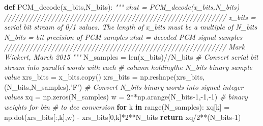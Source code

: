 \documentclass[11pt]{article}
\newenvironment{Shaded}{}{}
\newcommand{\KeywordTok}[1]{\textcolor[rgb]{0.00,0.44,0.13}{\textbf{{#1}}}}
\newcommand{\DecValTok}[1]{\textcolor[rgb]{0.25,0.63,0.44}{{#1}}}
\newcommand{\StringTok}[1]{\textcolor[rgb]{0.25,0.44,0.63}{{#1}}}
\newcommand{\CommentTok}[1]{\textcolor[rgb]{0.38,0.63,0.69}{\textit{{#1}}}}
\newcommand{\NormalTok}[1]{{#1}}
\newcommand{\ControlFlowTok}[1]{\textcolor[rgb]{0.00,0.44,0.13}{\textbf{{#1}}}}
\newcommand{\OperatorTok}[1]{\textcolor[rgb]{0.40,0.40,0.40}{{#1}}}
\newcommand{\BuiltInTok}[1]{{#1}}
\begin{document}
\begin{Shaded}
\begin{Highlighting}[]
    
\KeywordTok{def}\NormalTok{ PCM_decode(x_bits,N_bits):}
    \CommentTok{"""}
\CommentTok{    xhat = PCM_decode(x_bits,N_bits)}
\CommentTok{    /////////////////////////////////////////////////////////////}
\CommentTok{    x_bits = serial bit stream of 0/1 values. The length of }
\CommentTok{             x_bits must be a multiple of N_bits}
\CommentTok{    N_bits = bit precision of PCM samples}
\CommentTok{      xhat = decoded PCM signal samples}
\CommentTok{    /////////////////////////////////////////////////////////////}
\CommentTok{    Mark Wickert, March 2015}
\CommentTok{    """}
\NormalTok{    N_samples }\OperatorTok{=} \BuiltInTok{len}\NormalTok{(x_bits)}\OperatorTok{//}\NormalTok{N_bits}
    \CommentTok{# Convert serial bit stream into parallel words with each }
    \CommentTok{# column holdingthe N_bits binary sample value}
\NormalTok{    xrs_bits }\OperatorTok{=}\NormalTok{ x_bits.copy()}
\NormalTok{    xrs_bits }\OperatorTok{=}\NormalTok{ np.reshape(xrs_bits,(N_bits,N_samples),}\StringTok{'F'}\NormalTok{)}
    \CommentTok{# Convert N_bits binary words into signed integer values}
\NormalTok{    xq }\OperatorTok{=}\NormalTok{ np.zeros(N_samples)}
\NormalTok{    w }\OperatorTok{=} \DecValTok{2}\OperatorTok{**}\NormalTok{np.arange(N_bits}\OperatorTok{-}\DecValTok{1}\NormalTok{,}\OperatorTok{-}\DecValTok{1}\NormalTok{,}\OperatorTok{-}\DecValTok{1}\NormalTok{) }\CommentTok{# binary weights for bin }
                                     \CommentTok{# to dec conversion}
    \ControlFlowTok{for}\NormalTok{ k }\KeywordTok{in} \BuiltInTok{range}\NormalTok{(N_samples):}
\NormalTok{       xq[k] }\OperatorTok{=}\NormalTok{ np.dot(xrs_bits[:,k],w) }\OperatorTok{-}\NormalTok{ xrs_bits[}\DecValTok{0}\NormalTok{,k]}\OperatorTok{*}\DecValTok{2}\OperatorTok{**}\NormalTok{N_bits}
    \ControlFlowTok{return}\NormalTok{ xq}\OperatorTok{/}\DecValTok{2}\OperatorTok{**}\NormalTok{(N_bits}\OperatorTok{-}\DecValTok{1}\NormalTok{)}
    

\end{Highlighting}
\end{Shaded}
\end{document}
